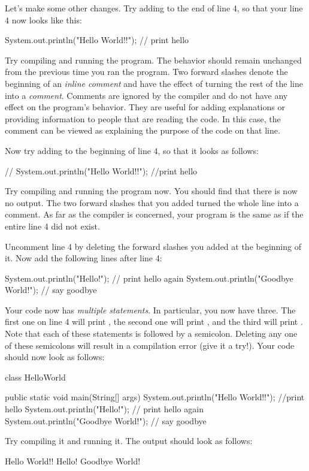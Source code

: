 Let's make some other changes.
Try adding  to the end of line 4, so that your line 4 now looks like this:
\begin{code}
        System.out.println("Hello World!!"); // print hello
\end{code}
Try compiling and running the program. The behavior should remain unchanged from the previous time you ran the program.
Two forward slashes \ic{//} denote the beginning of an \emph{inline comment} and have the effect of
turning the rest of the line into a \emph{comment}. Comments are ignored by the compiler and do not have any effect on
the program's behavior. They are
useful for adding explanations or providing information to people that are reading the code. In this case,
the comment  can be viewed as explaining the purpose of the code on that line.

Now try adding \ic{//} to the beginning of line 4, so that it looks as follows:
\begin{code}
//        System.out.println("Hello World!!"); //print hello
\end{code}
Try compiling and running the program now. You should find that there is now no output. The two forward slashes that you added turned the whole line into a comment. As far as the compiler is concerned, your program is the same
as if the entire line 4 did not exist.

Uncomment line 4 by deleting the forward slashes you added at the beginning of it.
Now add the following lines after line 4:
\begin{code}
System.out.println("Hello!"); // print hello again
System.out.println("Goodbye World!"); // say goodbye
\end{code}
Your code now has \emph{multiple statements}. In particular, you now have three. The first one on line 4 will print
, the second one will print , and the third will print .
Note that each of these statements is followed by a semicolon.
Deleting any one of these semicolons will result in a compilation error (give it a try!).
Your code should now look as follows:
\begin{code}
class HelloWorld {
    
    public static void main(String[] args) {
        System.out.println("Hello World!!"); //print hello
        System.out.println("Hello!"); // print hello again
        System.out.println("Goodbye World!"); // say goodbye
    }
    
}
\end{code}
Try compiling it and running it. The output should look as follows:
\begin{code}
Hello World!!
Hello!
Goodbye World!
\end{code}

